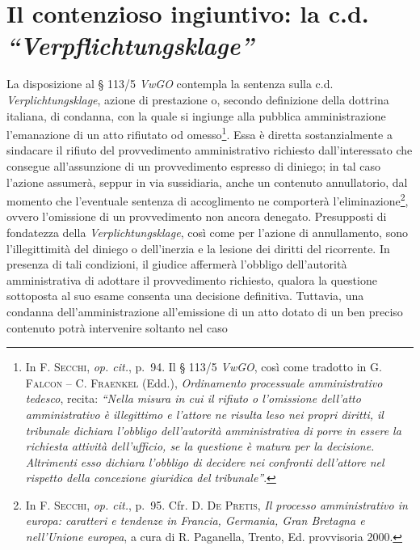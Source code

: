 \documentclass[12pt,it,a4paper,]{report}
\begin{document}
\hypertarget{il-contenzioso-ingiuntivo-la-c.d.-verpflichtungsklage}{%
\section{\texorpdfstring{Il contenzioso ingiuntivo: la c.d.
\emph{``Verpflichtungsklage''}}{Il contenzioso ingiuntivo: la c.d. ``Verpflichtungsklage''}}\label{il-contenzioso-ingiuntivo-la-c.d.-verpflichtungsklage}}

La disposizione al § 113/5 \emph{VwGO} contempla la sentenza sulla c.d.
\emph{Verplichtungsklage}, azione di prestazione o, secondo definizione
della dottrina italiana, di condanna, con la quale si ingiunge alla
pubblica amministrazione l'emanazione di un atto rifiutato od
omesso\footnote{In \textsc{F. Secchi}, \emph{op. cit.}, p.~94. Il §
  113/5 \emph{VwGO}, così come tradotto in G. \textsc{Falcon} -- C.
  \textsc{Fraenkel} (Edd.), \emph{Ordinamento processuale amministrativo
  tedesco}, recita: \emph{``Nella misura in cui il rifiuto o l'omissione
  dell'atto amministrativo è illegittimo e l'attore ne risulta leso nei
  propri diritti, il tribunale dichiara l'obbligo dell'autorità
  amministrativa di porre in essere la richiesta attività dell'ufficio,
  se la questione è matura per la decisione. Altrimenti esso dichiara
  l'obbligo di decidere nei confronti dell'attore nel rispetto della
  concezione giuridica del tribunale''}.}. Essa è diretta
sostanzialmente a sindacare il rifiuto del provvedimento amministrativo
richiesto dall'interessato che consegue all'assunzione di un
provvedimento espresso di diniego; in tal caso l'azione assumerà, seppur
in via sussidiaria, anche un contenuto annullatorio, dal momento che
l'eventuale sentenza di accoglimento ne comporterà
l'eliminazione\footnote{In \textsc{F. Secchi}, \emph{op. cit.}, p.~95.
  Cfr. D. \textsc{De Pretis}, \emph{Il processo amministrativo in
  europa: caratteri e tendenze in Francia, Germania, Gran Bretagna e
  nell'Unione europea}, a cura di R. Paganella, Trento, Ed. provvisoria
  2000.}, ovvero l'omissione di un provvedimento non ancora denegato.
Presupposti di fondatezza della \emph{Verplichtungsklage}, così come per
l'azione di annullamento, sono l'illegittimità del diniego o
dell'inerzia e la lesione dei diritti del ricorrente. In presenza di
tali condizioni, il giudice affermerà l'obbligo dell'autorità
amministrativa di adottare il provvedimento richiesto, qualora la
questione sottoposta al suo esame consenta una decisione definitiva.
Tuttavia, una condanna dell'amministrazione all'emissione di un atto
dotato di un ben preciso contenuto potrà intervenire soltanto nel caso
\end{document}
